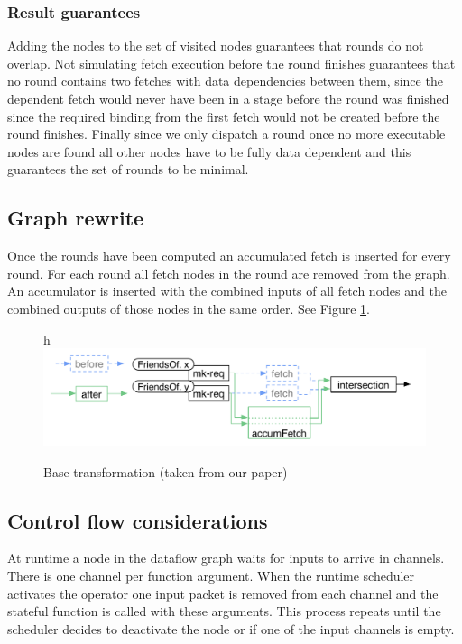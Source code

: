 \subsubsection{Result guarantees}

Adding the \fetch{} nodes to the set of visited nodes guarantees that rounds do not overlap.
Not simulating fetch execution before the round finishes guarantees that no round contains two fetches with data dependencies between them, since the dependent fetch would never have been in a stage before the round was finished since the required binding from the first fetch would not be created before the round finishes.
Finally since we only dispatch a round once no more executable nodes are found all other nodes have to be fully data dependent and this guarantees the set of rounds to be minimal.

\subsection{Graph rewrite}

Once the rounds have been computed an accumulated fetch is inserted for every round.
For each round all fetch nodes in the round are removed from the graph.
An accumulator is inserted with the combined inputs of all fetch nodes and the combined outputs of those nodes in the same order. See Figure \ref{fig:yauhau-transformation}.

\begin{figure}{h}
    \includegraphics[width=\textwidth]{Figures/yauhau-transformation}
	\caption{Base transformation (taken from our paper\cite{ErtelGoensAdamEtAl2016})}
	\label{fig:yauhau-transformation}
\end{figure}

\subsection{Control flow considerations}

At runtime a node in the dataflow graph waits for inputs to arrive in channels.
There is one channel per function argument.
When the runtime scheduler activates the operator one input packet is removed from each channel and the stateful function is called with these arguments.
This process repeats until the scheduler decides to deactivate the node or if one of the input channels is empty.

